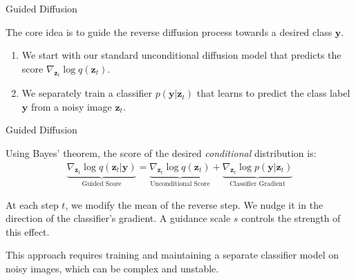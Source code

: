 \documentclass[aspectratio=169,xcolor=dvipsnames]{beamer}
\theoremstyle{named}
\begin{document}

\begin{frame}{Guided Diffusion}

The core idea is to \alert{guide the reverse diffusion process} towards a desired class $\mathbf{y}$.

\vspace{0.5em}

\begin{enumerate}
    \item We start with our standard unconditional diffusion model that predicts the score $\nabla_{\mathbf{z}_t} \log q(\mathbf{z}_t)$.
    \item We separately train a classifier $p(\mathbf{y}|\mathbf{z}_t)$ that learns to predict the class label $\mathbf{y}$ from a noisy image $\mathbf{z}_t$.
\end{enumerate}

\end{frame}


\begin{frame}{Guided Diffusion}

Using Bayes' theorem, the score of the desired \textit{conditional} distribution is:
\begin{align*}
    \underbrace{\nabla_{\mathbf{z}_t} \log q(\mathbf{z}_t|\mathbf{y})}_\text{Guided Score} = \underbrace{\nabla_{\mathbf{z}_t} \log q(\mathbf{z}_t)}_\text{Unconditional Score} + \underbrace{\nabla_{\mathbf{z}_t} \log p(\mathbf{y}|\mathbf{z}_t)}_\text{Classifier Gradient}
\end{align*}

At each step $t$, we modify the mean of the reverse step. We nudge it in the direction of the classifier's gradient. A guidance scale $s$ controls the strength of this effect.

\vspace{1em}

This approach requires training and maintaining a separate classifier model on noisy images, which can be complex and unstable.

\end{frame}

\end{document}
